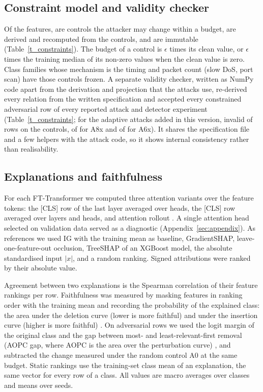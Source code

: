 \subsection{Constraint model and validity checker}
\label{sec:constraints}
Of the \nFeatures{} features, \nControls{} are controls the attacker may change within a budget, \nDerived{} are
derived and recomputed from the controls, and \nImmutable{} are immutable (Table~\ref{t_constraints}).
The budget of a control is $\epsilon$ times its clean value, or $\epsilon$ times the training median of its non-zero
values when the clean value is zero.
Class families whose mechanism is the timing and packet count (slow DoS, port scan) have those controls frozen.
A separate validity checker, written as NumPy code apart from the derivation and projection that the attacks use,
re-derived every relation from the written specification and accepted every constrained adversarial row of every
reported attack and detector experiment (Table~\ref{t_constraints}; for the adaptive attacks added in this version,
\sbInvalid{} invalid of \sbRows{} rows on the controls, \axInvalid{} of \axRows{} for A8x and \sxInvalid{} of
\sxRowsWritten{} for A6x).
It shares the specification file and a few helpers with the attack code, so it shows internal consistency rather than
realisability.



\subsection{Explanations and faithfulness}
For each FT-Transformer we computed three attention variants over the \nFeatures{} feature tokens: the [CLS] row of the
last layer averaged over heads, the [CLS] row averaged over layers and heads, and attention rollout
\cite{abnar2020}.
A single attention head selected on validation data served as a diagnostic (Appendix~\ref{sec:appendix}).
As references we used IG with the training mean as baseline, GradientSHAP, leave-one-feature-out occlusion, TreeSHAP of
an XGBoost model, the absolute standardised input $|x|$, and a random ranking.
Signed attributions were ranked by their absolute value.

Agreement between two explanations is the Spearman correlation of their feature rankings per row.
Faithfulness was measured by masking features in ranking order with the training mean and recording the probability of
the explained class: the area under the deletion curve (lower is more faithful) and under the insertion curve (higher
is more faithful) \cite{petsiuk2018,samek2017}.
On adversarial rows we used the logit margin of the original class and the gap between most- and least-relevant-first
removal (AOPC gap, where AOPC is the area over the perturbation curve) \cite{samek2017}, and subtracted the change measured under the random control
A0 at the same budget.
Static rankings use the training-set class mean of an explanation, the same vector for every row of a class.
All values are macro averages over classes and means over seeds.

